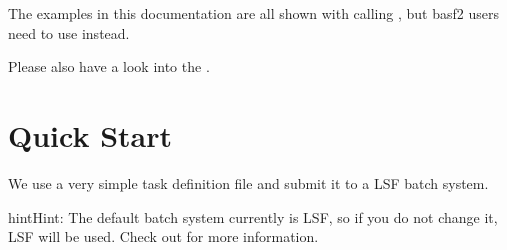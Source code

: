 \documentclass[letterpaper,10pt,english]{sphinxmanual}
\begin{document}
The examples in this documentation are all shown with calling , but basf2 users need to use 
instead.

Please also have a look into the {\hyperref[\detokenize{advanced/basf2-examples:basf2-example-label}]{}}.


\section{Quick Start}
\label{\detokenize{usage/quickstart:quick-start}}\label{\detokenize{usage/quickstart:quick-start-label}}\label{\detokenize{usage/quickstart::doc}}
We use a very simple task definition file and submit it to a LSF batch system.

\begin{sphinxadmonition}{hint}{Hint:}
The default batch system currently is LSF, so if you do not change it, LSF will be
used. Check out {\hyperref[\detokenize{usage/batch:batch-label}]{}} for more information.
\end{sphinxadmonition}
\end{document}
